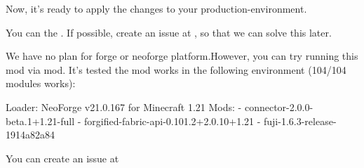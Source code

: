 Now, it's ready to apply the changes to your production-environment.


You can  the .
If possible, create an issue at \issueurl, so that we can solve this later.

We have no plan for forge or neoforge platform.However, you can try running this mod via  mod.
It's tested the mod works in the following environment (104/104 modules works):
\begin{sh}
    Loader: NeoForge v21.0.167 for Minecraft 1.21
    Mods:
    - connector-2.0.0-beta.1+1.21-full
    - forgified-fabric-api-0.101.2+2.0.10+1.21
    - fuji-1.6.3-release-1914a82a84
\end{sh}

You can create an issue at \issueurl



